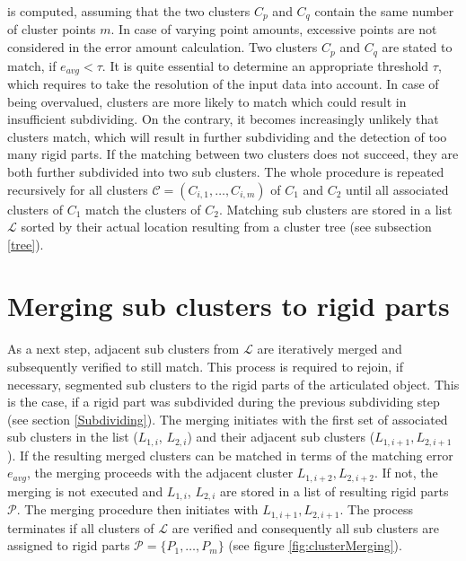 is computed, assuming that the two clusters $C_p$ and $C_q$ contain the same number of cluster points $m$. In case of varying point amounts, excessive points are not considered in the error amount calculation. Two clusters $C_p$ and $C_q$ are stated to match, if $e_{avg} < \tau$. It is quite essential to determine an appropriate threshold $\tau$, which requires to take the resolution of the input data into account. In case of being overvalued, clusters are more likely to match which could result in insufficient subdividing. On the contrary, it becomes increasingly unlikely that clusters match, which will result in further subdividing and the detection of too many rigid parts. If the matching between two clusters does not succeed, they are both further subdivided into two sub clusters. The whole procedure is repeated recursively for all clusters $\mathcal{C} = (C_{i,1}, \ldots, C_{i,m})$ of $C_1$ and $C_2$ until all associated clusters of $C_1$ match the clusters of $C_2$. Matching sub clusters are stored in a list $\mathcal{L}$ sorted by their actual location resulting from a cluster tree (see subsection \ref{tree}).

\section{Merging sub clusters to rigid parts}
\label{mergingClusters}
As a next step, adjacent sub clusters from $\mathcal{L}$ are iteratively merged and subsequently verified to still match. This process is required to rejoin, if necessary, segmented sub clusters to the rigid parts of the articulated object. This is the case, if a rigid part was subdivided during the previous subdividing step (see section \ref{Subdividing}). The merging initiates with the first set of associated sub clusters in the list ($L_{1,i}$, $L_{2,i}$) and their adjacent sub clusters ($L_{1,i+1},L_{2,i+1}$). If the resulting merged clusters can be matched in terms of the matching error $e_{avg}$, the merging proceeds with the adjacent cluster $L_{1,i+2},L_{2,i+2}$. If not, the merging is not executed and $L_{1,i}$, $L_{2,i}$ are stored in a list of resulting rigid parts $\mathcal{P}$. The merging procedure then initiates with $L_{1,i+1},L_{2,i+1}$. The process terminates if all clusters of $\mathcal{L}$ are verified and consequently all sub clusters are assigned to rigid parts $\mathcal{P} =  \{P_1,\ldots,P_m\}$ (see figure \ref{fig:clusterMerging}). 


